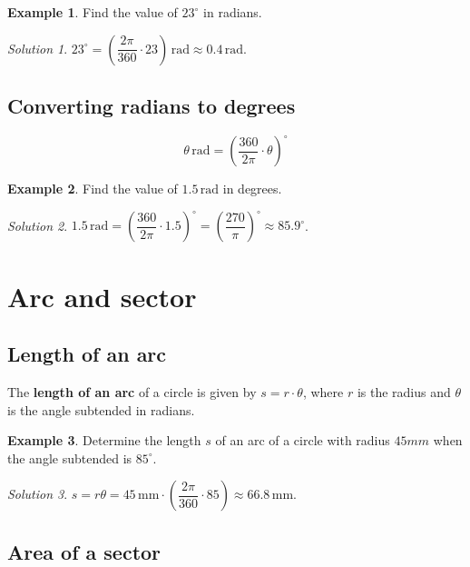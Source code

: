 \documentclass[
  12pt,
  oneside]{book}
\theoremstyle{definition}
\theoremstyle{definition}
\newtheorem{example}{Example}[chapter]
\theoremstyle{definition}
\theoremstyle{definition}
\theoremstyle{remark}
\newtheorem*{solution}{Solution}
\begin{document}
\begin{example}
Find the value of \(23^\circ\) in radians.
\end{example}

\begin{solution}
\(23^\circ = \left(\dfrac{2\pi}{360}\cdot 23\right)\,\mathrm{rad} \approx 0.4\,\mathrm{rad}\).
\end{solution}

\subsection{Converting radians to degrees}\label{converting-radians-to-degrees}

\[\theta\,\mathrm{rad}=\left(\dfrac{360}{2\pi}\cdot\theta\right)^\circ\]

\begin{example}
Find the value of \(1.5\,\mathrm{rad}\) in degrees.
\end{example}

\begin{solution}
\(1.5\,\mathrm{rad} = \left(\dfrac{360}{2\pi}\cdot 1.5\right)^\circ = \left(\dfrac{270}{\pi}\right)^\circ \approx 85.9^\circ\).
\end{solution}

\section{Arc and sector}\label{arc-and-sector}

\subsection{Length of an arc}\label{length-of-an-arc}

The \textbf{length of an arc} of a circle is given by \(s=r\cdot\theta\), where \(r\) is the radius and \(\theta\) is the angle subtended in radians.

\begin{example}
Determine the length \(s\) of an arc of a circle with radius \(45mm\) when the angle subtended is \(85^\circ\).
\end{example}

\begin{solution}
\(s=r\theta = 45\,\mathrm{mm}\cdot\left(\dfrac{2\pi}{360}\cdot 85\right) \approx 66.8\,\mathrm{mm}\).
\end{solution}

\subsection{Area of a sector}\label{area-of-a-sector}
\end{document}
